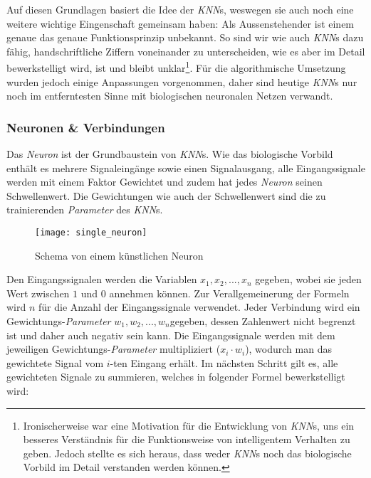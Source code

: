 Auf diesen Grundlagen basiert die Idee der \textit{KNN}s, weswegen sie auch noch eine weitere wichtige Eingenschaft gemeinsam haben: Als Aussenstehender ist einem genaue das genaue Funktionsprinzip unbekannt. So sind wir wie auch \textit{KNN}s dazu fähig, handschriftliche Ziffern voneinander zu unterscheiden, wie es aber im Detail bewerkstelligt wird, ist und bleibt unklar\footnote{Ironischerweise war eine Motivation für die Entwicklung von \textit{KNN}s, uns ein besseres Verständnis für die Funktionsweise von intelligentem Verhalten zu geben. Jedoch stellte es sich heraus, dass weder \textit{KNN}s noch das biologische Vorbild im Detail verstanden werden können.}. Für die algorithmische Umsetzung wurden jedoch einige Anpassungen vorgenommen, daher sind heutige \textit{KNN}s nur noch im entferntesten Sinne mit biologischen neuronalen Netzen verwandt. 

\subsubsection{Neuronen \& Verbindungen}\label{cha:theo:neurons}
Das \textit{Neuron} ist der Grundbaustein von \textit{KNN}s. Wie das biologische Vorbild enthält es mehrere Signaleingänge sowie einen Signalausgang, alle Eingangssignale werden mit einem Faktor Gewichtet und zudem hat jedes \textit{Neuron} seinen Schwellenwert. Die Gewichtungen wie auch der Schwellenwert sind die zu trainierenden \textit{Parameter} des \textit{KNN}s.
\begin{figure}[h]
	\centering
	\texttt{[image: single\_neuron]}
	\caption[Schema von einem künstlichen Neuron]{Schema von einem künstlichen Neuron}
	\label{img:single_neuron}
\end{figure}

Den Eingangssignalen werden die Variablen  $x_1, x_2,...,x_n$ gegeben, wobei sie jeden Wert zwischen $1$ und $0$ annehmen können. Zur Verallgemeinerung der Formeln wird $n$ für die Anzahl der Eingangssignale verwendet. Jeder Verbindung wird ein Gewichtungs-\textit{Parameter} $w_1, w_2,...,w_n$\footnotemark gegeben, dessen Zahlenwert nicht begrenzt ist und daher auch negativ sein kann. Die Eingangssignale werden mit dem jeweiligen Gewichtungs-\textit{Parameter} multipliziert ($x_i\cdot w_i$), wodurch man das gewichtete Signal vom $i$-ten Eingang erhält. Im nächsten Schritt gilt es, alle gewichteten Signale zu summieren, welches in folgender Formel bewerkstelligt wird:

	
